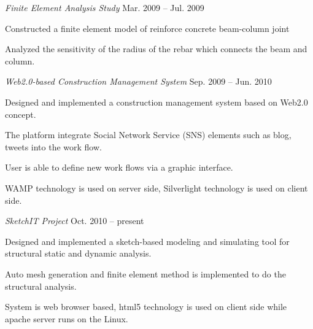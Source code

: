 \documentclass[margin,line]{resume}
\begin{document}
\begin{resume}
	\textsl{Finite Element Analysis Study} \hfill Mar. 2009 -- Jul. 2009
	\vspace{-2mm}\\\vspace{-1mm}%
	\begin{list2}
		\item Constructed a finite element model of reinforce concrete beam-column joint
		\item Analyzed the sensitivity of the radius of the rebar which connects the beam and column.
	\end{list2}
	
	\textsl{Web2.0-based Construction Management System} \hfill Sep. 2009 -- Jun. 2010
	\vspace{-2mm}\\\vspace{-1mm}%
	\begin{list2}
		\item Designed and implemented a construction management system based on Web2.0 concept.
		\item The platform integrate Social Network Service (SNS) elements such as blog, tweets into the work flow.
		\item User is able to define new work flows via a graphic interface.
		\item WAMP technology is used on server side, Silverlight technology is used on client side.  
	\end{list2}
	
	\textsl{SketchIT Project} \hfill Oct. 2010 -- present
	\vspace{-2mm}\\\vspace{-1mm}%
	\begin{list2}
		\item Designed and implemented a sketch-based modeling and simulating tool for structural static and dynamic analysis.
		\item Auto mesh generation and finite element method is implemented to do the structural analysis.
		\item System is web browser based, html5 technology is used on client side while apache server runs on the Linux.
	\end{list2}

	



\end{resume}
\end{document}
